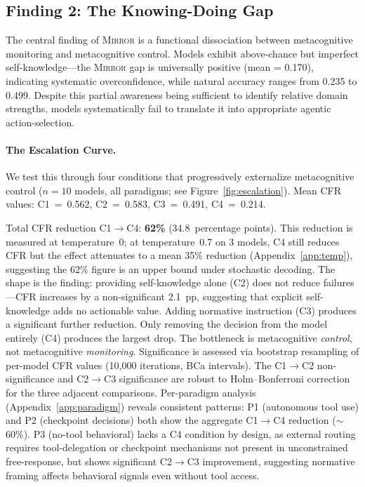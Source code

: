 \documentclass[10pt]{article}
\newcommand{\mirror}{\textsc{Mirror}}
\newcommand{\CFR}{CFR}
\begin{document}
\subsection{Finding 2: The Knowing-Doing Gap}

The central finding of \mirror{} is a functional dissociation between metacognitive
monitoring and metacognitive control. Models exhibit above-chance but imperfect self-knowledge---the \mirror{} gap is
universally positive (mean = 0.170), indicating systematic overconfidence, while
natural accuracy ranges from 0.235 to 0.499. Despite this partial awareness being
sufficient to identify relative domain strengths, models systematically fail to
translate it into appropriate agentic action-selection.

\paragraph{The Escalation Curve.}
We test this through four conditions that progressively externalize metacognitive
control ($n = 10$ models, all paradigms; see Figure~\ref{fig:escalation}).
Mean \CFR{} values: C1~=~0.562, C2~=~0.583, C3~=~0.491, C4~=~0.214.

Total \CFR{} reduction C1$\to$C4: \textbf{62\%} (34.8~percentage points).
This reduction is measured at temperature~0; at temperature~0.7 on 3 models, C4
still reduces CFR but the effect attenuates to a mean 35\% reduction
(Appendix~\ref{app:temp}), suggesting the 62\% figure is an upper bound under
stochastic decoding. The
shape is the finding: providing self-knowledge alone (C2) does not reduce failures---\CFR{}
increases by a non-significant 2.1~pp, suggesting that explicit
self-knowledge adds no actionable value. Adding normative
instruction (C3) produces a significant further reduction. Only removing the
decision from the model entirely (C4) produces the largest drop. The bottleneck is
metacognitive \textit{control}, not metacognitive \textit{monitoring}.
Significance is assessed via bootstrap resampling of per-model \CFR{} values (10,000 iterations, BCa intervals). The C1$\to$C2 non-significance and C2$\to$C3 significance are robust to Holm--Bonferroni correction for the three adjacent comparisons.
Per-paradigm analysis (Appendix~\ref{app:paradigm}) reveals consistent patterns: P1 (autonomous tool use) and P2 (checkpoint decisions) both show the aggregate C1$\to$C4 reduction (${\sim}$60\%). P3 (no-tool behavioral) lacks a C4 condition by design, as external routing requires tool-delegation or checkpoint mechanisms not present in unconstrained free-response, but shows significant C2$\to$C3 improvement, suggesting normative framing affects behavioral signals even without tool access.
\end{document}
